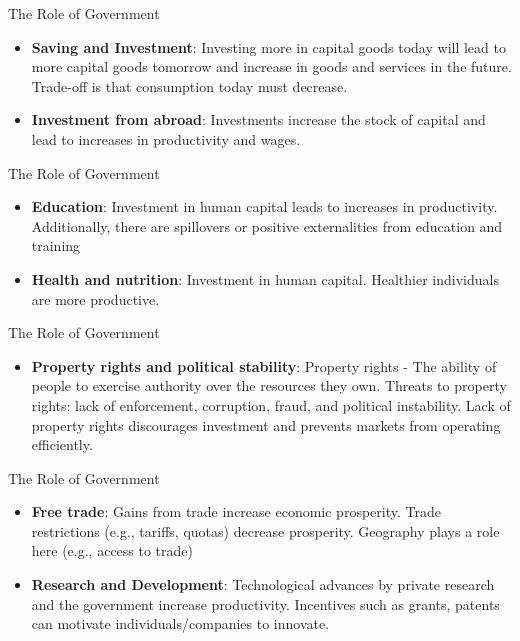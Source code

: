 \documentclass[xcolor={dvipsnames},pdf, hyperref={colorlinks=true, citecolor=ForestGreen, linkcolor=BlueViolet, urlcolor=Magenta}]{beamer}
\theoremstyle{definition}
\begin{document}
\begin{frame}{The Role of Government}
\begin{itemize}
	\item \textbf{Saving and Investment}: Investing more in capital goods today will lead to more capital goods tomorrow and increase in goods and services in the future. Trade-off is that consumption today must decrease.
	\item \textbf{Investment from abroad}: Investments increase the stock of capital and lead to increases in productivity and wages.
\end{itemize}
\end{frame}


\begin{frame}{The Role of Government}
\begin{itemize}
	\item \textbf{Education}: Investment in human capital leads to increases in productivity. Additionally, there are spillovers or positive externalities from education and training
	\item \textbf{Health and nutrition}: Investment in human capital. Healthier individuals are more productive.
\end{itemize}
\end{frame}

\begin{frame}{The Role of Government}
\begin{itemize}
	\item \textbf{Property rights and political stability}: Property rights - The ability of people to exercise authority over the resources they own. Threats to property rights: lack of enforcement, corruption, fraud, and political instability. Lack of property rights discourages investment and prevents markets from operating efficiently.
\end{itemize}
\end{frame}

\begin{frame}{The Role of Government}
\begin{itemize}
	\item \textbf{Free trade}: Gains from trade increase economic prosperity. Trade restrictions (e.g., tariffs, quotas) decrease prosperity. Geography plays a role here (e.g., access to trade)
	\item \textbf{Research and Development}: Technological advances by private research and the government increase productivity. Incentives such as grants, patents can motivate individuals/companies to innovate.
\end{itemize}
\end{frame}
\end{document}
